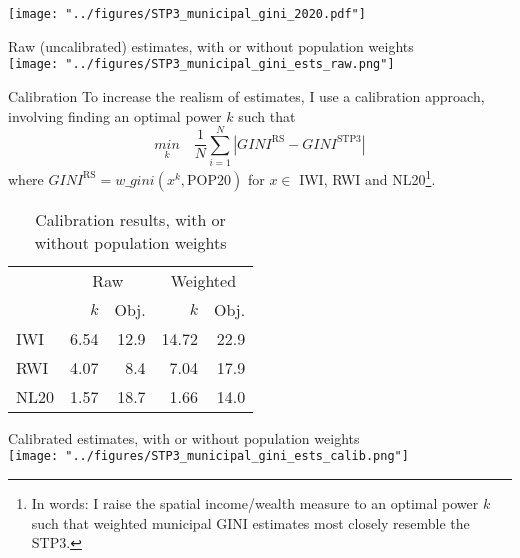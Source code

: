 \documentclass[compress,xcolor=dvipsnames]{beamer}
\newenvironment{noheadline}{
    \setbeamertemplate{headline}{}
    \addtobeamertemplate{frametitle}{\vspace*{-0.9\baselineskip}}{}
}{}
\begin{document}
\begin{frame}
\centering
\texttt{[image: "../figures/STP3\_municipal\_gini\_2020.pdf"]}
\end{frame}

\begin{frame}
Raw (uncalibrated) estimates, with or without population weights\\ \vspace{3mm}
\texttt{[image: "../figures/STP3\_municipal\_gini\_ests\_raw.png"]}
\end{frame}

\begin{noheadline}
\begin{frame}{Calibration}
To increase the realism of estimates, I use a calibration approach, involving finding an optimal power $k$ such that 
$$ \underset{k}{min}\quad \frac{1}{N} \sum_{i=1}^N |GINI^\text{RS} - GINI^\text{STP3}| $$
where $GINI^\text{RS} = w\_gini(x^k, \text{POP20})$ for $x\in$ IWI, RWI and NL20\footnote{In words: I raise the spatial income/wealth measure to an optimal power $k$ such that weighted municipal GINI estimates most closely resemble the STP3.}. 
\begin{table} \vspace{-3mm}
\centering
\caption{Calibration results, with or without population weights}
\begin{tabular}{lrrrr} \toprule
& \multicolumn{2}{c}{Raw} & \multicolumn{2}{c}{Weighted} \\
& $k$ & Obj. & $k$ & Obj. \\ \midrule
IWI & 6.54 & 12.9 & 14.72 & 22.9 \\
RWI & 4.07 & 8.4 & 7.04 & 17.9 \\
NL20 & 1.57 & 18.7 & 1.66 & 14.0 \\ \bottomrule
\end{tabular}
\end{table}
\end{frame}
\end{noheadline}

\begin{frame}
Calibrated estimates, with or without population weights\\ \vspace{3mm}
\texttt{[image: "../figures/STP3\_municipal\_gini\_ests\_calib.png"]}
\end{frame}
\end{document}
